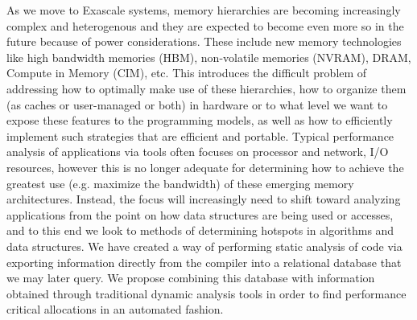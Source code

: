 As we move to Exascale systems, memory hierarchies are becoming increasingly complex and heterogenous and they are expected to become even more so in the future because of power considerations. These include new memory technologies like high bandwidth memories (HBM), non-volatile memories (NVRAM), DRAM, Compute in Memory (CIM), etc.
This introduces the difficult problem of addressing how to optimally make use of these hierarchies, how to organize them (as caches or user-managed or both) in hardware or to what level we want to expose these features to the programming models, as well as how to efficiently  implement such strategies that are efficient and portable.
Typical performance analysis of applications via tools often focuses on processor and network, I/O resources, however this is no longer adequate for determining how to achieve the greatest use (e.g. maximize the bandwidth) of these emerging memory architectures. Instead, the focus will increasingly need to shift toward analyzing applications from the point on how data structures are being used or accesses, and to this end we look to methods of determining 
hotspots in algorithms and data structures.
We have created a way of performing static analysis of code via exporting information directly from the compiler into a relational 
database that we may later query.
We propose combining this database with information obtained through traditional dynamic analysis tools in order to find 
performance critical allocations in an automated fashion.


